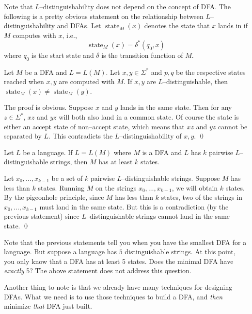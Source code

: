 \newpage
Note that $L$--distinguishability does not depend on the concept of DFA.
The following is a pretty obvious statement on
the relationship between $L$--distinguishability and DFAs.
Let $\operatorname{state}_M(x)$ denotes the state that $x$ lands in
if $M$ computes with $x$, i.e.,
\[
\operatorname{state}_M(x) = \delta^*(q_0, x)
\]
where $q_0$ is the start state and
$\delta$ is the transition function 
of $M$.

\begin{prop}
  Let $M$ be a DFA and $L = L(M)$.
  Let $x, y \in \Sigma^*$ and $p,q$ be the respective states reached when
  $x,y$ are computed with $M$.
  If $x,y$ are $L$--distinguishable, then $\operatorname{state}_M(x) \neq \operatorname{state}_M(y)$. 
\end{prop}
\proof
The proof is obvious.
Suppose $x$ and $y$ lands in the same state.
Then for any $z \in \Sigma^*$, $xz$ and $yz$ will both also land in a common state.
Of course the state is either an accept state of non--accept state,
which means that $xz$ and $yz$ cannot be separated by $L$.
This contradicts the $L$--distinguishability of $x,y$.
\qed

\begin{prop}
  Let $L$ be a language.
  If $L = L(M)$ where $M$ is a DFA and $L$ has $k$ pairwise $L$--distinguishable strings,
  then $M$ has at least $k$ states.
\end{prop}
\proof
Let $x_0, \ldots, x_{k-1}$ be a set of $k$ pairwise $L$--distinguishable strings.
Suppose $M$ has less than $k$ states.
Running $M$ on the strings $x_0, \ldots, x_{k-1}$, we will obtain $k$ states.
By the pigeonhole principle, since $M$ has less than $k$ states,
two of the strings in $x_0, \ldots, x_{k-1}$ must land in the same state.
But this is a contradiction (by the previous statement) since $L$--distinguishable strings
cannot land in the same state.
\qed

\newpage


\newpage
Note that the previous statements tell you when you have the smallest DFA for a language.
But suppose a language has $5$ distinguishable strings.
At this point, you only know that a DFA has at least 5 states.
Does the minimal DFA have \textit{exactly} 5?
The above statement does not address this question.

Another thing to note is that we already have many techniques for
designing DFAs.
What we need is to use those techniques to build a DFA, and \textit{then} minimize \textit{that} DFA just built.


